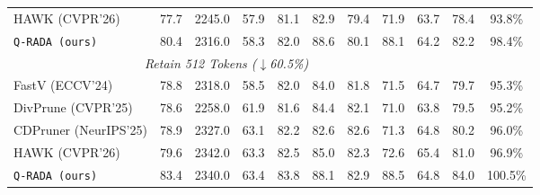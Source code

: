 \begin{table}[t]
\begin{tabular}{l|cccccccc|cc}
        HAWK (CVPR'26)
        & 77.7 & 2245.0 & 57.9 & 81.1 & 82.9 & 79.4 & 71.9 & 63.7 & 78.4 & 93.8\% \\

        \rowcolor{gray!20}\texttt{Q-RADA (ours)}
        & 80.4
        & 2316.0
        & 58.3
        & 82.0
        & 88.6
        & 80.1
        & 88.1
        & 64.2
        & 82.2
        & 98.4\% \\
        \midrule

        \multicolumn{9}{c}{\textit{Retain 512 Tokens ($\downarrow$60.5\%)}} \\
        \midrule
        FastV (ECCV'24)
        & 78.8 & 2318.0 & 58.5 & 82.0 & 84.0& 81.8 &71.5 &64.7&79.7& 95.3\% \\
        DivPrune (CVPR'25)
        & 78.6 & 2258.0 & 61.9 & 81.6 & 84.4& 82.1 &71.0&63.8&79.5& 95.2\% \\
        CDPruner (NeurIPS'25)
        & 78.9 & 2327.0 & 63.1 & 82.2 & 82.6& 82.6 &71.3&64.8&80.2& 96.0\% \\

        HAWK (CVPR'26)
        & 79.6 & 2342.0 & 63.3 & 82.5 & 85.0 & 82.3 & 72.6 & 65.4 & 81.0 & 96.9\% \\
        \rowcolor{gray!20}\texttt{Q-RADA (ours)}
        & 83.4
        & 2340.0
        & 63.4
        & 83.8
        & 88.1
        & 82.9
        & 88.5
        & 64.8
        & 84.0
        & 100.5\% \\
        \bottomrule
    \end{tabular}
    \vspace{-2em}
\end{table}
